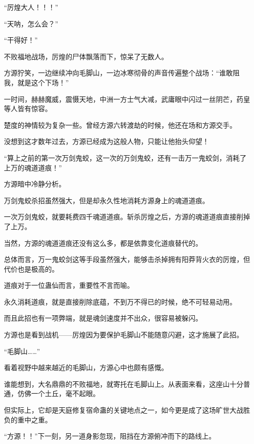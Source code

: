 
\begin{this_body}



“厉煌大人！！！”

“天呐，怎么会？”

“干得好！”

不败福地战场，厉煌的尸体飘落而下，惊呆了无数人。

方源狞笑，一边继续冲向毛脚山，一边冰寒彻骨的声音传遍整个战场：“谁敢阻我，就是这个下场！”

一时间，赫赫魔威，震慑天地，中洲一方士气大减，武庸眼中闪过一丝阴芒，药皇等人皆有惊容。

楚度的神情较为复杂一些。曾经方源六转渡劫的时候，他还在场和方源交手。

没想到这才数年过去，方源已经成为这般人物，只能让他抬头仰望！

“算上之前的第一次万剑鬼蛟，这一次的万剑鬼蛟，还有一击万一鬼蛟剑，消耗了上万的魂道道痕！”

方源暗中冷静分析。

万剑鬼蛟杀招虽然强大，但是却永久性地消耗方源身上的魂道道痕。

一次万剑鬼蛟，就要耗费四千魂道道痕。斩杀厉煌之后，方源的魂道道痕直接削掉了上万。

当然，方源的魂道道痕还没有这么多，都是依靠变化道痕替代的。

总体而言，万一鬼蛟剑这等手段虽然强大，能够击杀掉拥有阳莽背火衣的厉煌，但代价也是极高的。

道痕对于一位蛊仙而言，重要性不言而喻。

永久消耗道痕，就是直接削除底蕴，不到万不得已的时候，绝不可轻易动用。

而且此招也有一项弊端，就是魂剑速度并不出众，很容易被躲闪。

方源也是看到战机——厉煌因为要保护毛脚山不能随意闪避，这才施展了此招。

“毛脚山……”

看着视野中越来越近的毛脚山，方源心中也颇有感慨。

谁能想到，大名鼎鼎的不败福地，就寄托在毛脚山上。从表面来看，这座山十分普通，仿佛一个土丘，毫不起眼。

但实际上，它却是天庭修复宿命蛊的关键地点之一，如今更是成了这场旷世大战胜负的重中之重。

“方源！！”下一刻，另一道身影忽现，阻挡在方源俯冲而下的路线上。


\end{this_body}
